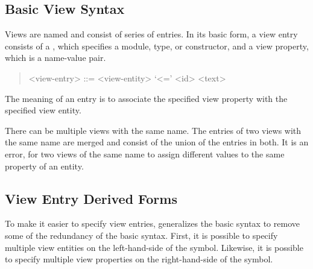 \subsection{Basic View Syntax}
Views are named and consist of series of entries.
In its basic form, a view entry consists of a , which specifies a module,
type, or constructor, and a view property, which is a name-value pair.
%
\begin{quote}\begin{grammar}
  <view-entry>  ::= <view-entity> `<=' <id> <text>
\end{grammar}\end{quote}%
%
The meaning of an entry is to associate the specified view property with the specified view entity.
%

There can be multiple views with the same name.
The entries of two views with the same name are merged and consist of the
union of the entries in both.
It is an error, for two views of the same name to assign different values
to the same property of an entity.

\subsection{View Entry Derived Forms}
To make it easier to specify view entries, \asdl{} generalizes the basic syntax
to remove some of the redundancy of the basic syntax.
First, it is possible to specify multiple view entities on the left-hand-side of
the \lit{<=} symbol.
Likewise, it is possible to specify multiple view properties on the right-hand-side
of the \lit{<=} symbol.

